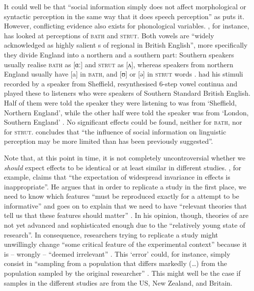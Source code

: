 It could well be that ``social information simply does not affect morphological or syntactic perception in the same way that it does speech perception'' as \textcite[229]{squires2013} puts it.
However, conflicting evidence also exists for phonological variables.
\textcite{lawrence2015}, for instance, has looked at perceptions of \textsc{bath} and \textsc{strut}.
Both vowels are ``widely acknowledged as highly salient s of regional  in British English'', more specifically they divide England into a northern and a southern part: Southern speakers usually realise \textsc{bath} as [ɑː] and \textsc{strut} as [ʌ], whereas speakers from northern England usually have [a] in \textsc{bath}, and [ʊ] or [ə] in \textsc{strut} words \parencite[cf.][1]{lawrence2015}.
\citeauthor{lawrence2015} had his stimuli recorded by a speaker from Sheffield, resynthesised 6-step vowel continua and played these to listeners who were speakers of Southern Standard British English.
Half of them were told the speaker they were listening to was from `Sheffield, Northern England', while the other half were told the speaker was from `London, Southern England' \parencite[cf.][2--3]{lawrence2015}.
No significant  effects could be found, neither for \textsc{bath}, nor for \textsc{strut}.
\textcite[cf.][4]{lawrence2015} concludes that ``the influence of social information on linguistic perception may be more limited than has been previously suggested''.

Note that, at this point in time, it is not completely uncontroversial whether we \emph{should} expect  effects to be identical or at least similar in different studies.
\textcite[45]{cesario2014}, for example, claims that ``the expectation of widespread invariance in  effects is inappropriate''.
He argues that in order to replicate a study in the first place, we need to know which features ``must be reproduced exactly for a  attempt to be informative'' and goes on to explain that we need to have ``relevant theories that tell us that these features should matter'' \parencite[42]{cesario2014}.
In his opinion, though, theories of  are not yet advanced and sophisticated enough due to the ``relatively young state of  research''.
In consequence, researchers trying to replicate a study might unwillingly change ``some critical feature of the experimental context'' because it is -- wrongly -- ``deemed irrelevant'' \parencite[43]{cesario2014}.
This `error' could, for instance, simply consist in ``sampling from a population that differs markedly (\ldots) from the population sampled by the original researcher'' \parencite[43]{cesario2014}.
This might well be the case if samples in the different studies are from the US, New Zealand, and Britain.

